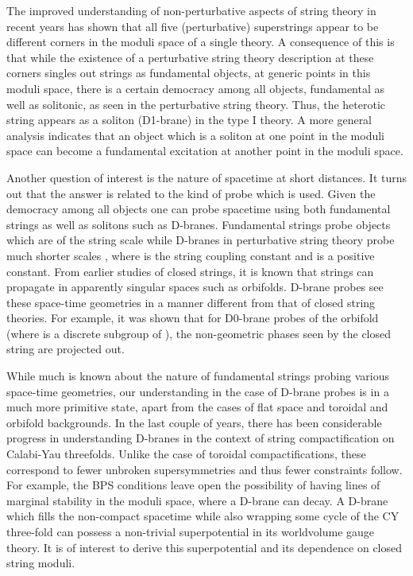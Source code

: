 \documentclass[a4paper,12pt]{article}
\def\Bbb{\mathbb}
\def\BC{\mbox{\myHighlight{$\Bbb C$}\coordHE{}}} \def\BP{\mbox{\myHighlight{$\Bbb P$}\coordHE{}}}
\begin{document}
The improved understanding of non-perturbative aspects of string theory in
recent years has shown that all five (perturbative) superstrings appear to
be different corners in the moduli space of a single theory\cite{schwarz}.
A consequence of this is that while the existence of a perturbative string
theory description at these corners singles out strings as fundamental
objects, at generic points in this moduli space, there is a certain
democracy among all objects, fundamental as well as solitonic, as seen in
the perturbative string theory. Thus, the heterotic string appears as a
soliton (D1-brane) in the type I theory. A more general analysis indicates
that an object which is a soliton at one point in the moduli space can
become a fundamental excitation at another point in the moduli
space\cite{hull}. 

Another question of interest is the nature of spacetime at short
distances. It turns out that the answer is related to the kind of probe
which is used. Given the democracy among all objects one can probe
spacetime using both fundamental strings as well as solitons such as
D-branes. Fundamental strings probe objects which are of the string scale
\coordHE{} while D-branes in perturbative string theory probe much shorter
scales \coordHE{}, where \coordHE{} is the string coupling constant and \coordHE{}
is a positive constant\cite{scales}. From earlier studies of closed
strings, it is known that strings can propagate in apparently singular
spaces such as orbifolds. D-brane probes see these space-time geometries in
a manner different from that of closed string theories. For example, it
was shown that for D0-brane probes of the orbifold \myHighlight{$\BC^3/\Gamma$}\coordHE{} (where
\myHighlight{$\Gamma$}\coordHE{} is a discrete subgroup of \coordHE{}), the non-geometric phases seen
by the closed string are projected out\cite{dgm}. 

While much is known about the nature of fundamental strings probing
various space-time geometries, our understanding in the case of D-brane
probes is in a much more primitive state, apart from the cases of flat
space and toroidal and orbifold backgrounds.  In the last couple of years,
there has been considerable progress in understanding
D-branes in the context of string compactification on Calabi-Yau
threefolds\cite{ooy,RS,quintic,doug1,stt,boundarylg,dgepner,dfr,
ketal,HV,HIV,kklm2,doug-diac,others}. 
Unlike the case of toroidal compactifications, these correspond to fewer
unbroken supersymmetries and thus fewer constraints follow. For example,
the BPS conditions leave open the possibility of having lines of marginal
stability in the moduli space, where a D-brane can decay.  A D-brane which
fills the non-compact spacetime while also wrapping some cycle of the CY
three-fold can possess a non-trivial superpotential in its worldvolume
gauge theory.  It is of interest to derive this superpotential and its
dependence on closed string moduli. 
\end{document}
